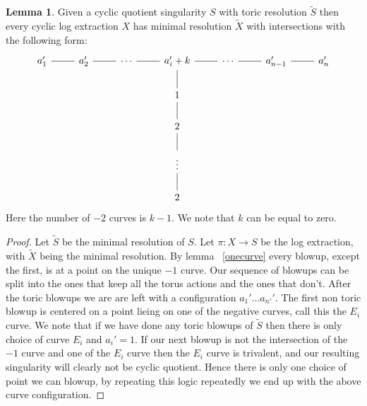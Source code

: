 \documentclass[11pt]{amsart}
\theoremstyle{definition}
\theoremstyle{definition}
\theoremstyle{definition}
\theoremstyle{definition}
\theoremstyle{definition}
\newtheorem{lem}[thm]{Lemma}
\theoremstyle{definition}
\theoremstyle{definition}
\theoremstyle{definition}
\newcommand{\wt}[1]{\widetilde{#1}}
\begin{document}
\begin{lem}
Given a cyclic quotient singularity $S$ with toric resolution $\wt{S}$ then every cyclic log extraction $X$ has minimal resolution $\wt{X}$ with intersections with the following form:
\[
\begin{tikzcd}
a_1' \arrow[r, no head] & a_2' \arrow[r, no head] & \cdots \arrow[r, no head] & a_i' + k \arrow[r, no head] \arrow[d, no head] & \cdots  \arrow[r, no head] & a_{n-1}' \arrow[r, no head] & a_n' \\
                       &                        &                           & 1                                             &                            &                            &     \\
                       &                        &                           & 2 \arrow[u, no head]                          &                            &                            &     \\
                       &                        &                           & \vdots \arrow[d, no head] \arrow[u, no head]  &                            &                            &     \\
                       &                        &                           & 2                                             &                            &                            &    
\end{tikzcd}
\]
Here the number of $-2$ curves is $k-1$. We note that $k$ can be equal to zero.
\end{lem}

\begin{proof}
Let $\widetilde{S}$ be the minimal resolution of $S$. Let $\pi : X \rightarrow S$ be the log extraction, with $\widetilde{X}$ being the minimal resolution. By lemma ~\ref{onecurve} every  blowup, except the first, is at a point on the unique $-1$ curve. Our sequence of blowups can be split into the ones that keep all the torus actions and the ones that don't. After the toric blowups we are are left with a configuration $a_1' \dots a_{n'}'$. The first non toric blowup is centered on a point lieing on one of the negative curves, call this the $E_i$ curve. We note that if we have done any toric blowups of $\wt{S}$ then there is only choice of curve $E_i$ and $a_i' = 1$. If our next blowup is not the intersection of the $-1$ curve and one of the $E_i$ curve then the $E_i$ curve is trivalent, and our resulting singularity will clearly not be cyclic quotient. Hence there is only one choice of point we can blowup, by repeating this logic repeatedly we end up with the above curve configuration.
\end{proof}
\end{document}
